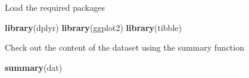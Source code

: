 \documentclass[
]{book}
\newenvironment{Shaded}{\begin{snugshade}}{\end{snugshade}}
\newcommand{\FunctionTok}[1]{\textcolor[rgb]{0.13,0.29,0.53}{\textbf{#1}}}
\newcommand{\NormalTok}[1]{#1}
\begin{document}
Load the required packages

\begin{Shaded}
\begin{Highlighting}[]
\FunctionTok{library}\NormalTok{(dplyr)}
\FunctionTok{library}\NormalTok{(ggplot2)}
\FunctionTok{library}\NormalTok{(tibble)}
\end{Highlighting}
\end{Shaded}

Check out the content of the dataset using the summary function

\begin{Shaded}
\begin{Highlighting}[]
\FunctionTok{summary}\NormalTok{(dat)}
\end{Highlighting}
\end{Shaded}
\end{document}
